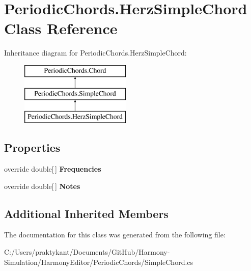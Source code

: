 \hypertarget{class_periodic_chords_1_1_herz_simple_chord}{\section{Periodic\+Chords.\+Herz\+Simple\+Chord Class Reference}
\label{class_periodic_chords_1_1_herz_simple_chord}
}
Inheritance diagram for Periodic\+Chords.\+Herz\+Simple\+Chord\+:\begin{figure}[H]
\begin{center}
\leavevmode
\includegraphics[height=3.000000cm]{class_periodic_chords_1_1_herz_simple_chord}
\end{center}
\end{figure}
\subsection*{Properties}
\begin{DoxyCompactItemize}
\item 
\hypertarget{class_periodic_chords_1_1_herz_simple_chord_ae121de3de908e42b6814eb80661ba623}{override double\mbox{[}$\,$\mbox{]} {\bfseries Frequencies}}\label{class_periodic_chords_1_1_herz_simple_chord_ae121de3de908e42b6814eb80661ba623}

\item 
\hypertarget{class_periodic_chords_1_1_herz_simple_chord_a84ce2c5b4d290b3cad788f15cf1314fb}{override double\mbox{[}$\,$\mbox{]} {\bfseries Notes}}\label{class_periodic_chords_1_1_herz_simple_chord_a84ce2c5b4d290b3cad788f15cf1314fb}

\end{DoxyCompactItemize}
\subsection*{Additional Inherited Members}


The documentation for this class was generated from the following file\+:\begin{DoxyCompactItemize}
\item 
C\+:/\+Users/praktykant/\+Documents/\+Git\+Hub/\+Harmony-\/\+Simulation/\+Harmony\+Editor/\+Periodic\+Chords/Simple\+Chord.\+cs\end{DoxyCompactItemize}
